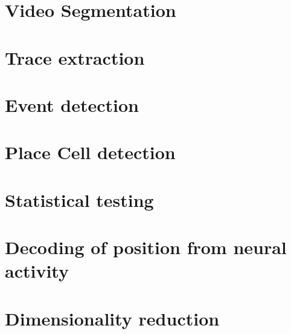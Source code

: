 \section{Video Segmentation}
\label{chap3:sec:4:segmentation}

\section{Trace extraction}
\label{chap3:sec:5:trace_extraction}

\section{Event detection}
\label{chap3:sec:6:event_det}

\section{Place Cell detection}
\label{chap3:sec:7:pc_det}

\section{Statistical testing}
\label{chap3:sec:8:stats}

\section{Decoding of position from neural activity}
\label{chap3:sec:9:decoders}

\section{Dimensionality reduction}
\label{chap3:sec:10:dim_red}
